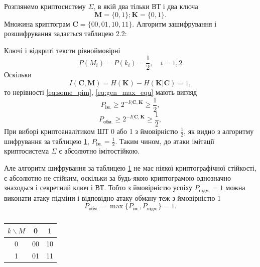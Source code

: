 \begin{example} \label{expl:gesn_resistence_imito}
    Розглянемо криптосистему $\Sigma$, в якій два тільки ВТ і два
    ключа
    \begin{equation*}
        \mathbf{M} = \{0, 1\}; \mathbf{K} = \{0, 1\}.
    \end{equation*}
    Множина криптограм $\mathbf{C} = \{00, 01, 10, 11\}$.
    Алгоритм зашифрування і розшифрування задається таблицею 2.2:
    
    Ключі і відкриті тексти рівноймовірні
    \begin{equation*}
        P(M_i) = P(k_i) = \frac{1}{2}, \quad i = \overline{1, 2}
    \end{equation*}
    Оскільки
    \begin{equation*}
        I(\mathbf{C}, \mathbf{M}) = H(\mathbf{K}) - H(\mathbf{K} | \mathbf{C}) = 1,
    \end{equation*}
    то нерівності \ref{eq:some_pim}, \ref{eq:gen_max_equ} мають вигляд
    \begin{equation}
        P_{\text{ім.}} \geqslant 2^{- I(\mathbf{C}, \mathbf{K}} \geqslant \frac{1}{2},
    \end{equation}
    \begin{equation}
        P_{\text{обм.}} \geqslant 2^{- I(\mathbf{C}, \mathbf{K}} \geqslant \frac{1}{2},
    \end{equation}
    При виборі криптоаналітиком ШТ 0 або 1 з ймовірністю $\frac{1}{2}$, як видно з
    алгоритму шифрування за таблицею \ref{tab:decipr}, $P_{\text{ім.}} = \frac{1}{2}$. Таким чином, до атаки
    імітації криптосистема $\Sigma$ є абсолютно імітостійкою.
    
    Але алгоритм шифрування за таблицею \ref{tab:decipr} не має ніякої криптографічної
    стійкості, є абсолютно не стійким, оскільки за будь-якою криптограмою
    однозначно знаходься і секретний ключ і ВТ. Тобто з ймовірністю успіху
    $P_{\text{підм.}} = 1$ можна виконати атаку підміни і відповідно атаку обману теж з
    ймовірністю 1
    \begin{equation*}
        P_{\text{обм.}} = \max\{P_{\text{ім.}}, P_{\text{підм.}} \} = 1.
    \end{equation*}
\end{example}

\begin{table}[ht]
    \centering
    \begin{tabular}{|c|c|c|}
        \hline $k \backslash M$ & 0 & 1 \\
        \hline 0 & 00 & 10 \\
        \hline 1 & 01 & 11 \\
        \hline
    \end{tabular}
    \caption{}
    \label{tab:decipr}
\end{table}

